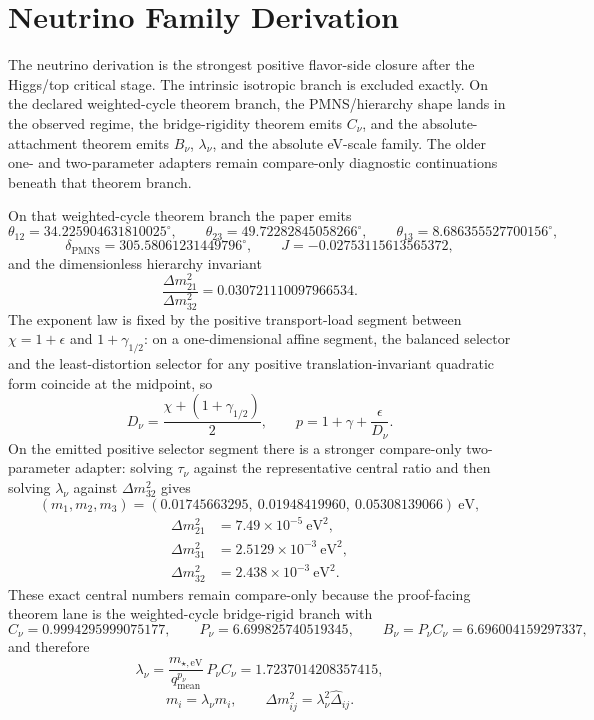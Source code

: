 \documentclass[11pt]{article}
\begin{document}
\section{Neutrino Family Derivation}

The neutrino derivation is the strongest positive flavor-side closure after the Higgs/top
critical stage. The intrinsic isotropic branch is excluded exactly. On the declared
weighted-cycle theorem branch, the PMNS/hierarchy shape lands in the observed regime, the
bridge-rigidity theorem emits \(C_\nu\), and the absolute-attachment theorem emits \(B_\nu\),
\(\lambda_\nu\), and the absolute eV-scale family. The older one- and two-parameter adapters
remain compare-only diagnostic continuations beneath that theorem branch.

On that weighted-cycle theorem branch the paper emits
\[
\theta_{12}=34.225904631810025^\circ,\qquad
\theta_{23}=49.72282845058266^\circ,\qquad
\theta_{13}=8.686355527700156^\circ,
\]
\[
\delta_{\mathrm{PMNS}}=305.58061231449796^\circ,\qquad
J=-0.02753115613565372,
\]
and the dimensionless hierarchy invariant
\[
\frac{\Delta m_{21}^2}{\Delta m_{32}^2}=0.030721110097966534.
\]
The exponent law is fixed by the positive transport-load segment between
\(\chi=1+\epsilon\) and \(1+\gamma_{1/2}\): on a one-dimensional affine segment,
the balanced selector and the least-distortion selector for any positive
translation-invariant quadratic form coincide at the midpoint, so
\[
D_\nu=\frac{\chi+(1+\gamma_{1/2})}{2},
\qquad
p=1+\gamma+\frac{\epsilon}{D_\nu}.
\]
On the emitted positive selector segment there is a stronger compare-only two-parameter adapter: solving \(\tau_\nu\) against the representative central ratio and then solving \(\lambda_\nu\) against \(\Delta m_{32}^2\) gives
\[
(m_1,m_2,m_3)=(0.01745663295,\ 0.01948419960,\ 0.05308139066)\ \mathrm{eV},
\]
\[
\begin{aligned}
\Delta m_{21}^2&=7.49\times10^{-5}\ \mathrm{eV}^2,\\
\Delta m_{31}^2&=2.5129\times10^{-3}\ \mathrm{eV}^2,\\
\Delta m_{32}^2&=2.438\times10^{-3}\ \mathrm{eV}^2.
\end{aligned}
\]
These exact central numbers remain compare-only because the proof-facing theorem lane is the weighted-cycle bridge-rigid branch with
\[
C_\nu=0.9994295999075177,\qquad
P_\nu=6.699825740519345,\qquad
B_\nu=P_\nu C_\nu=6.696004159297337,
\]
and therefore
\[
\lambda_\nu=\frac{m_{\star,\mathrm{eV}}}{q_{\mathrm{mean}}^{p_\nu}}\,P_\nu C_\nu=1.7237014208357415,
\]
\[
m_i=\lambda_\nu \widehat m_i,
\qquad
\Delta m_{ij}^2=\lambda_\nu^2 \widehat{\Delta}_{ij}.
\]
\end{document}
